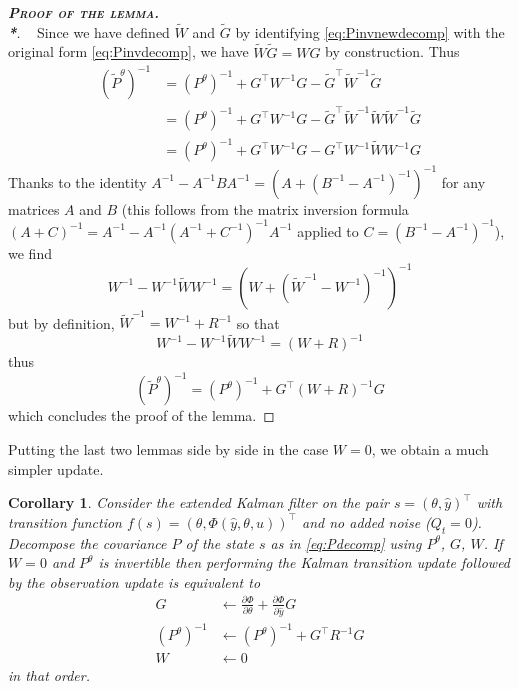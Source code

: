 \documentclass[11pt,a4paper]{article}
\newcommand{\thmheadercommand}[1]{\textbf{\scshape{}#1.\\*}}
\newcommand{\1}{\mathbbm{1}}
\newenvironment{dem}[1][]{\begin{proof}[\thmheadercommand{Proof#1}]~\newline\ignorespaces}{\end{proof}}
\theoremstyle{yannthm}
\newtheorem{cor}[defi]{Corollary}
\theoremstyle{yannthm2}
\newcommand{\transp}[1]{#1^{\!\top}\!}
\newcommand{\Ptheta}{P^\theta}
\newcommand{\transf}{\Phi}
\numberwithin{equation}{section}
\begin{document}
\begin{dem}[ of the lemma]
Since we have defined $\tilde W$ and $\tilde G$ by identifying
\eqref{eq:Pinvnewdecomp} with the original form \eqref{eq:Pinvdecomp}, we
have $\tilde W\tilde G=WG$ by construction. Thus
\begin{align}
(\tilde
\Ptheta)^{-1}&= (\Ptheta)^{-1}+\transp{G}W^{-1}G-\transp{\tilde
G}\tilde W^{-1}\tilde G
\\&=(\Ptheta)^{-1}+\transp{G}W^{-1}G-\transp{\tilde
G}\tilde W^{-1}\tilde W\tilde W^{-1}\tilde G
\\&=(\Ptheta)^{-1}+\transp{G}W^{-1}G-\transp{G}W^{-1}\tilde W
W^{-1}G
\end{align}
Thanks to the identity
$A^{-1}-A^{-1}BA^{-1}=(A+(B^{-1}-A^{-1})^{-1})^{-1}$ for any matrices $A$
and $B$ (this follows from the matrix inversion formula
$(A+C)^{-1}=A^{-1}-A^{-1}(A^{-1}+C^{-1})^{-1}A^{-1}$ applied to
$C=(B^{-1}-A^{-1})^{-1}$), we find
\begin{equation}
W^{-1}-W^{-1}\tilde W W^{-1}=(W+(\tilde W^{-1}-W^{-1})^{-1})^{-1}
\end{equation}
but by definition, $\tilde W^{-1}=W^{-1}+R^{-1}$ so that
\begin{equation}
W^{-1}-W^{-1}\tilde W W^{-1}=(W+R)^{-1}
\end{equation}
thus
\begin{equation}
(\tilde
\Ptheta)^{-1}=(\Ptheta)^{-1}+\transp{G}(W+R)^{-1}G
\end{equation}
which concludes the proof of the lemma.
\end{dem}

Putting the last two lemmas side by side in the case $W=0$, we obtain a
much simpler update.

\begin{cor}
\label{cor:kaldecomp}
Consider the extended Kalman filter on the pair $s=\transp{(\theta, \hat
y)}$ with
transition function $f(s)=\transp{(\theta,\transf(\hat y,\theta,u))}$ and no
added noise ($Q_t=0$). Decompose the covariance $P$ of the state $s$ as in
\eqref{eq:Pdecomp} using $\Ptheta$, $G$, $W$.
If $W=0$ and $\Ptheta$ is invertible then
performing the Kalman transition update followed by the observation update
is equivalent to
\begin{align}
G&\gets \frac{\partial \transf}{\partial \theta}+\frac{\partial
\transf}{\partial \hat y}G
\\
\label{eq:recPinvupdatesimple}
(\Ptheta)^{-1}&\gets (\Ptheta)^{-1}+\transp{G}R^{-1}G
\\
W&\gets 0
\end{align}
in that order.
\end{cor}
\end{document}

